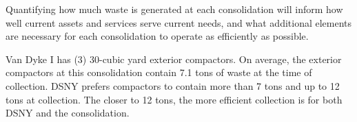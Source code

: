 
    Quantifying how much waste is generated at each consolidation will inform how well current assets and services serve current needs, and what additional elements are necessary for each consolidation to operate as efficiently as possible.
    
    Van Dyke I has (3) 30-cubic yard exterior compactors. On average, the exterior compactors at this consolidation contain 7.1 tons of waste at the time of collection. DSNY prefers compactors to contain more than 7 tons and up to 12 tons at collection. The closer to 12 tons, the more efficient collection is for both DSNY and the consolidation.